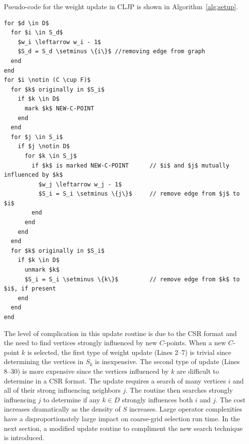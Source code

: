 \documentclass{elsart}
\begin{document}
Pseudo-code for the weight update in CLJP is shown in Algorithm~\ref{alg:setup}.
\begin{lstlisting}[caption={CLJP Weight Update for CSR Matrix},label=alg:setup]
%\textsc{Update-Weights}$(S,\, D,\, C,\, F,\, w)$%
for $d \in D$
  for $i \in S_d$
    $w_i \leftarrow w_i - 1$
    $S_d = S_d \setminus \{i\}$ //removing edge from graph
  end
end
for $i \notin (C \cup F)$
  for $k$ originally in $S_i$
    if $k \in D$
      mark $k$ NEW-C-POINT
    end
  end
  for $j \in S_i$
    if $j \notin D$
      for $k \in S_j$
        if $k$ is marked NEW-C-POINT      // $i$ and $j$ mutually influenced by $k$
          $w_j \leftarrow w_j - 1$
          $S_i = S_i \setminus \{j\}$     // remove edge from $j$ to $i$
        end
      end
    end
  end
  for $k$ originally in $S_i$
    if $k \in D$
      unmark $k$
      $S_i = S_i \setminus \{k\}$         // remove edge from $k$ to $i$, if present
    end
  end
end
\end{lstlisting}
The level of complication in this update routine is due to the CSR
format and the need to find vertices strongly influenced by new
$C$-points. When a new $C$-point $k$ is selected, the first type of
weight update (Lines 2--7) is trivial since determining the vertices
in $S_k$ is inexpensive. The second type of update (Lines 8--30) is
more expensive since the vertices influenced by $k$ are difficult to
determine in a CSR format. The update requires a search of many
vertices $i$ and all of their strong influencing neighbors $j$. The
routine then searches strongly influencing $j$ to determine if any $k
\in D$ strongly influences both $i$ and $j$. The cost increases
dramatically as the density of $S$ increases. Large operator
complexities have a disproportionately large impact on coarse-grid
selection run time. In the next section, a modified update routine to
compliment the new search technique is introduced.
\end{document}
